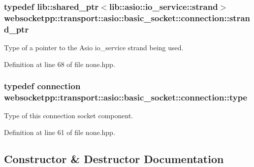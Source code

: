 \subsubsection[{strand\+\_\+ptr}]{\setlength{\rightskip}{0pt plus 5cm}typedef lib\+::shared\+\_\+ptr$<$lib\+::asio\+::io\+\_\+service\+::strand$>$ {\bf websocketpp\+::transport\+::asio\+::basic\+\_\+socket\+::connection\+::strand\+\_\+ptr}}\label{classwebsocketpp_1_1transport_1_1asio_1_1basic__socket_1_1connection_aed8283ac4f3aa27ada9cd899d579e497}


Type of a pointer to the Asio io\+\_\+service strand being used. 



Definition at line 68 of file none.\+hpp.

\hypertarget{classwebsocketpp_1_1transport_1_1asio_1_1basic__socket_1_1connection_a449a7d627f3e231de1f25668b544478a}{}
\subsubsection[{type}]{\setlength{\rightskip}{0pt plus 5cm}typedef {\bf connection} {\bf websocketpp\+::transport\+::asio\+::basic\+\_\+socket\+::connection\+::type}}\label{classwebsocketpp_1_1transport_1_1asio_1_1basic__socket_1_1connection_a449a7d627f3e231de1f25668b544478a}


Type of this connection socket component. 



Definition at line 61 of file none.\+hpp.



\subsection{Constructor \& Destructor Documentation}
\hypertarget{classwebsocketpp_1_1transport_1_1asio_1_1basic__socket_1_1connection_a8c8b36c6623f84e77e5a628c5f2ca92c}{}
